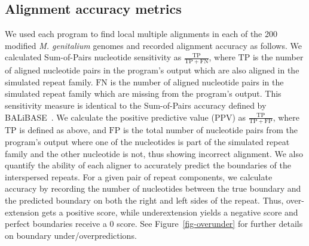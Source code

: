 \documentclass[12pt,journal,letterpaper,onecolumn, draftcls]{IEEEtran}
\begin{document}
\subsection*{Alignment accuracy metrics}
\label{sec:metrics}
We used each program to find local multiple alignments in each of the
200 modified \emph{M. genitalium} genomes and recorded alignment
accuracy as follows. We calculated Sum-of-Pairs nucleotide sensitivity
as $\frac{\mathrm{TP}}{\mathrm{TP} + \mathrm{FN}}$, where
$\mathrm{TP}$ is the number of aligned nucleotide pairs in the
program's output which are also aligned in the simulated repeat
family.  $\mathrm{FN}$ is the number of aligned nucleotide pairs in
the simulated repeat family which are missing from the program's
output.  This sensitivity measure is identical to the Sum-of-Pairs
accuracy defined by BALiBASE~\cite{ref-balibase}.  We calculate the
positive predictive value (PPV) as $\frac{\mathrm{TP}}{\mathrm{TP} +
\mathrm{FP}}$, where $\mathrm{TP}$ is defined as above, and
$\mathrm{FP}$ is the total number of nucleotide pairs from the
program's output where one of the nucleotides is part of the
simulated repeat family and the other nucleotide is not, thus showing
incorrect alignment. We also quantify the ability of each aligner to accurately predict the
boundaries of the interspersed repeats.  For a given pair of repeat components, we calculate accuracy by recording the number of nucleotides between the true boundary and the predicted boundary
on both the right and left sides of the repeat.  Thus, over-extension gets a positive score, while underextension
yields a negative score and perfect boundaries receive a 0 score. See Figure~\ref{fig-overunder} for
further details on boundary under/overpredictions.
\end{document}

